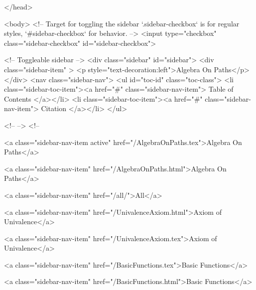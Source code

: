   
</head>




  <body>
    <!-- Target for toggling the sidebar `.sidebar-checkbox` is for regular
     styles, `#sidebar-checkbox` for behavior. -->
<input type="checkbox" class="sidebar-checkbox" id="sidebar-checkbox">

<!-- Toggleable sidebar -->
<div class="sidebar" id="sidebar">
  <div class="sidebar-item" >
    <p style="text-decoration:left">Algebra On Paths</p>
  </div>
  <nav class="sidebar-nav">
    <ul id="toc-id" class="toc-class">
  <li class="sidebar-toc-item"><a href="#" class="sidebar-nav-item"> Table of Contents </a></li>
  <li class="sidebar-toc-item"><a href="#" class="sidebar-nav-item"> Citation </a></li>
</ul>


    <!--  -->
    <!-- 
      
    
      
    
      
    
      
        
      
    
      
        
          <a class="sidebar-nav-item active" href="/AlgebraOnPaths.tex">Algebra On Paths</a>
        
      
    
      
        
          <a class="sidebar-nav-item" href="/AlgebraOnPaths.html">Algebra On Paths</a>
        
      
    
      
        
          <a class="sidebar-nav-item" href="/all/">All</a>
        
      
    
      
        
          <a class="sidebar-nav-item" href="/UnivalenceAxiom.html">Axiom of Univalence</a>
        
      
    
      
        
          <a class="sidebar-nav-item" href="/UnivalenceAxiom.tex">Axiom of Univalence</a>
        
      
    
      
        
          <a class="sidebar-nav-item" href="/BasicFunctions.tex">Basic Functions</a>
        
      
    
      
        
          <a class="sidebar-nav-item" href="/BasicFunctions.html">Basic Functions</a>
        
